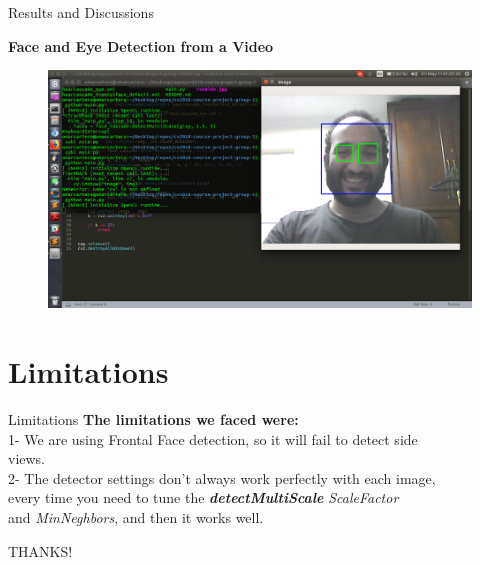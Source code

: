 \documentclass[10pt]{beamer}
\newcommand\tab[1][0.5cm]{\hspace*{#1}}
\begin{document}
\begin{frame}{Results and Discussions}

\centering
\textbf{Face and Eye Detection from a Video}

\begin{figure}
\vspace*{0cm}
\hspace*{0cm}
\includegraphics[scale=0.3]{samples/face_eye_video}
\end{figure}
\end{frame}



\section{Limitations}
\begin{frame}{Limitations}
\textbf{The limitations we faced were:} \\
\tab 1- We are using Frontal Face detection, so it will fail to detect side \\ \tab[0.8cm] views. \\
\tab 2- The detector settings don't always work perfectly with each image, \\ \tab[0.8cm] every time you need to tune the \textbf{\textit{detectMultiScale}} \textit{ScaleFactor} \\
\tab[0.8cm] and \textit{MinNeghbors}, and then it works well.
\end{frame}

\vspace*{2.5cm}
\hspace*{3.9cm}
\huge THANKS!
\end{document}
